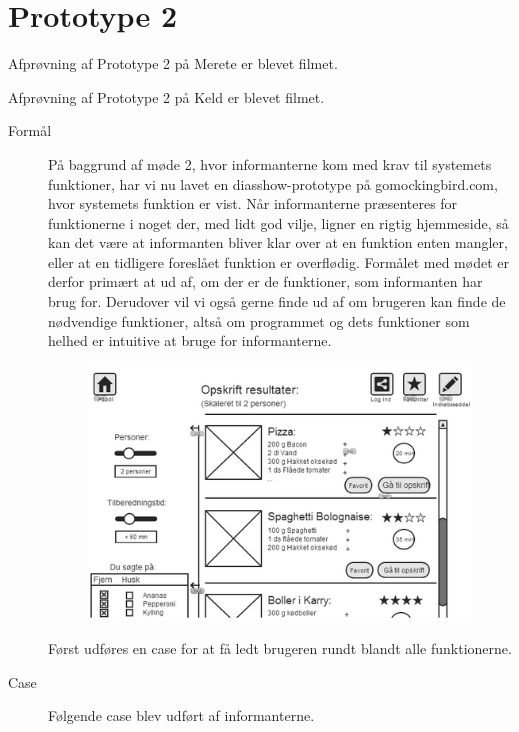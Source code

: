 \section{Prototype 2}
\label{ap:prototype2}

Afprøvning af Prototype 2 på Merete er blevet filmet\cite{prototype2merete}.

Afprøvning af Prototype 2 på Keld er blevet filmet\cite{prototype2keld}.

\begin{description}
\item[Formål] På baggrund af møde 2, hvor informanterne kom med krav til systemets funktioner, har vi nu lavet en diasshow-prototype på gomockingbird.com, hvor systemets funktion er vist. Når informanterne præsenteres for funktionerne i noget der, med lidt god vilje, ligner en rigtig hjemmeside, så kan det være at informanten bliver klar over at en funktion enten mangler, eller at en tidligere foreslået funktion er overflødig. Formålet med mødet er derfor primært at ud af, om der er de funktioner, som informanten har brug for. Derudover vil vi også gerne finde ud af om brugeren kan finde de nødvendige funktioner, altså om programmet og dets funktioner som helhed er intuitive at bruge for informanterne.
\begin{figure}[H]
\centering
\includegraphics[scale=0.7]{billeder/prototyper/prototype2.png}
\label{fig:prototype2}
\end{figure}

Først udføres en case for at få ledt brugeren rundt blandt alle funktionerne.

\item[Case] Følgende case blev udført af informanterne.


\end{description}
